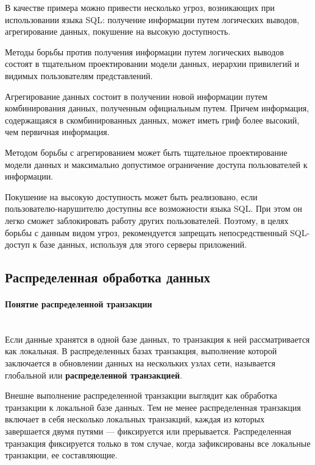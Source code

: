 В качестве примера можно привести несколько угроз, возникающих при использовании языка SQL: получение
информации путем логических выводов, агрегирование данных, покушение на высокую доступность.

Методы борьбы против получения информации путем логических выводов состоят в тщательном проектировании
модели данных, иерархии привилегий и видимых пользователям представлений.

Агрегирование данных состоит в получении новой информации путем комбинирования данных, полученным официальным
путем. Причем информация, содержащаяся в скомбинированных данных, может иметь гриф более высокий, чем первичная информация.

Методом борьбы с агрегированием может быть тщательное проектирование модели данных и максимально допустимое
ограничение доступа пользователей к информации.

Покушение на высокую доступность может быть реализовано, если пользователю-нарушителю доступны все возможности
языка SQL. При этом он легко сможет заблокировать работу других пользователей. Поэтому, в целях борьбы с данным
видом угроз, рекомендуется запрещать непосредственный SQL-доступ к базе данных, используя для этого серверы приложений.


\subsection{Распределенная обработка данных}
\paragraph{Понятие распределенной транзакции}~\\
Если данные хранятся в одной базе данных, то транзакция к ней рассматривается как локальная.
В распределенных базах транзакция, выполнение которой заключается в обновлении данных на нескольких узлах сети,
называется глобальной или \textbf{распределенной транзакцией}.

Внешне выполнение распределенной транзакции выглядит как обработка транзакции к локальной базе данных.
Тем не менее распределенная транзакция включает в себя несколько локальных транзакций, каждая из которых
завершается двумя путями — фиксируется или прерывается. Распределенная транзакция фиксируется только в том случае,
когда зафиксированы все локальные транзакции, ее составляющие.

